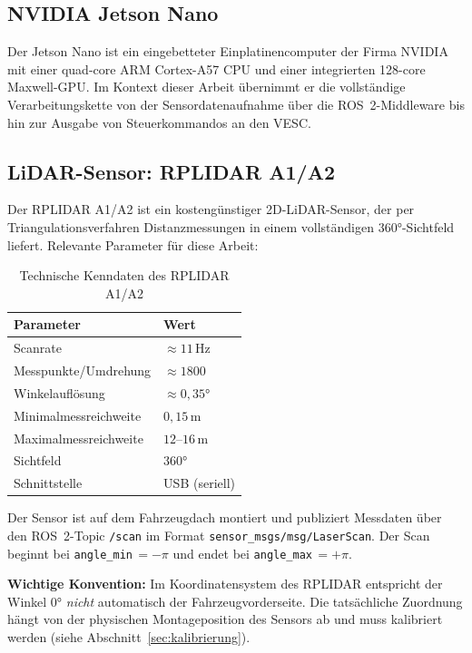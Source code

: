 \subsection{NVIDIA Jetson Nano}

Der Jetson Nano ist ein eingebetteter Einplatinencomputer der Firma NVIDIA
mit einer quad-core ARM Cortex-A57 CPU und einer integrierten 128-core
Maxwell-GPU. Im Kontext dieser Arbeit übernimmt er die vollständige
Verarbeitungskette von der Sensordatenaufnahme über die ROS~2-Middleware
bis hin zur Ausgabe von Steuerkommandos an den VESC.

\subsection{LiDAR-Sensor: RPLIDAR A1/A2}

Der RPLIDAR A1/A2 ist ein kostengünstiger 2D-LiDAR-Sensor, der per
Triangulationsverfahren Distanzmessungen in einem vollständigen
$360°$-Sichtfeld liefert. Relevante Parameter für diese Arbeit:

\begin{table}[H]
\centering
\caption{Technische Kenndaten des RPLIDAR A1/A2}
\label{tab:lidar}
\begin{tabular}{ll}
\toprule
\textbf{Parameter} & \textbf{Wert} \\
\midrule
Scanrate              & $\approx 11$\,Hz \\
Messpunkte/Umdrehung  & $\approx 1800$ \\
Winkelauflösung       & $\approx 0{,}35°$ \\
Minimalmessreichweite & $0{,}15$\,m \\
Maximalmessreichweite & $12$--$16$\,m \\
Sichtfeld             & $360°$ \\
Schnittstelle         & USB (seriell) \\
\bottomrule
\end{tabular}
\end{table}

Der Sensor ist auf dem Fahrzeugdach montiert und publiziert Messdaten
über den ROS~2-Topic \texttt{/scan} im Format
\texttt{sensor\_msgs/msg/LaserScan}. Der Scan beginnt bei
\texttt{angle\_min}\,$= -\pi$ und endet bei \texttt{angle\_max}\,$= +\pi$.

\textbf{Wichtige Konvention:} Im Koordinatensystem des RPLIDAR entspricht
der Winkel $0°$ \emph{nicht} automatisch der Fahrzeugvorderseite.
Die tatsächliche Zuordnung hängt von der physischen Montageposition
des Sensors ab und muss kalibriert werden (siehe Abschnitt~\ref{sec:kalibrierung}).

